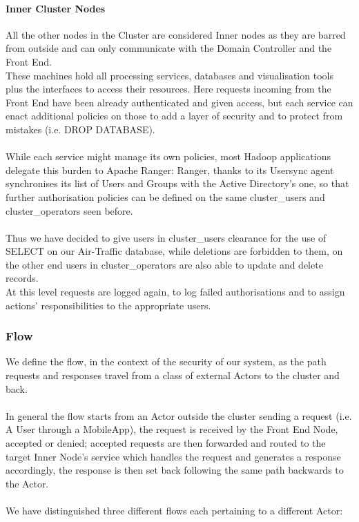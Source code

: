 \paragraph{Inner Cluster Nodes}
All the other nodes in the Cluster are considered Inner nodes as they are barred from outside and can only communicate with the Domain Controller and the Front End. \\
These machines hold all processing services, databases and visualisation tools plus the interfaces to access their resources. Here requests incoming from the Front End have been already authenticated and given access, but each service can enact additional policies on those to add a layer of security and to protect from mistakes (i.e. DROP DATABASE). \\ \\
While each service might manage its own policies, most Hadoop applications delegate this burden to Apache Ranger: Ranger, thanks to its Usersync agent synchronises its list of Users and Groups with the Active Directory's one, so that further authorisation policies can be defined on the same cluster\_users and cluster\_operators seen before. \\ \\
 Thus we have decided to give users in cluster\_users clearance for the use of SELECT on our Air-Traffic database, while deletions are forbidden to them, on the other end users in cluster\_operators are also able to update and delete records.
\\ At this level requests are logged again, to log failed authorisations and to assign actions' responsibilities to the appropriate users.

\subsubsection{Flow}
We define the flow, in the context of the security of our system, as the path requests and responses travel from a class of external Actors to the cluster and back.
\\ \\
In general the flow starts from an Actor outside the cluster sending a request (i.e. A User through a MobileApp), the request is received by the Front End Node, accepted or denied; accepted requests are then forwarded and routed to the target Inner Node's service which handles the request and generates a response accordingly, the response is then set back following the same path backwards to the Actor.
\\ \\
We have distinguished three different flows each pertaining to a different Actor:
